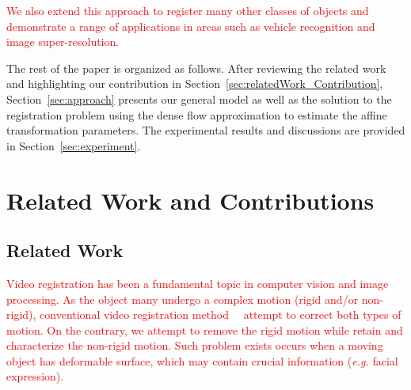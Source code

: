 \documentclass[10pt,journal]{IEEEtran}
\newcommand{\Songfan}[1]{\textcolor{red}{#1}}
\begin{document}
\Songfan{
We also extend this approach to register many other classes of objects and demonstrate a range of applications in areas such as vehicle recognition and image super-resolution. 
}

The rest of the paper is organized as follows. After reviewing the related work and highlighting our contribution in Section~\ref{sec:relatedWork_Contribution}, Section~\ref{sec:approach} presents our general model as well as the solution to the registration problem using the dense flow approximation to estimate the affine transformation parameters. The experimental results and discussions are provided in Section~\ref{sec:experiment}.


\section{\label{sec:relatedWork_Contribution}Related Work and Contributions}

\subsection{\label{sec:related_work}Related Work}

\Songfan{
Video registration has been a fundamental topic in computer vision and image processing. As the object many undergo a complex motion (rigid and/or non-rigid), conventional video registration method~\cite{Uenohara95}~\cite{Caspi_PAMI02} attempt to correct both types of motion. On the contrary, we attempt to remove the rigid motion while retain and characterize the non-rigid motion. Such problem exists occurs when a moving object has deformable surface, which may contain crucial information (\textit{e.g.} facial expression).}
\end{document}
